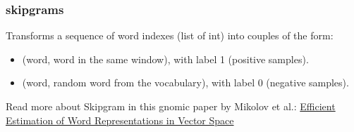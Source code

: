 \subsubsection{skipgrams}\label{skipgrams}

\begin{Shaded}
\begin{Highlighting}[]
    \OperatorTok{=}\OperatorTok{=}\OperatorTok{=}\NormalTok{,}
    \OperatorTok{=}\OperatorTok{=}\NormalTok{)}
\end{Highlighting}
\end{Shaded}

Transforms a sequence of word indexes (list of int) into couples of the
form:

\begin{itemize}
\tightlist
\item
  (word, word in the same window), with label 1 (positive samples).
\item
  (word, random word from the vocabulary), with label 0 (negative
  samples).
\end{itemize}

Read more about Skipgram in this gnomic paper by Mikolov et al.:
\href{http://arxiv.org/pdf/1301.3781v3.pdf}{Efficient Estimation of Word
Representations in Vector Space}

